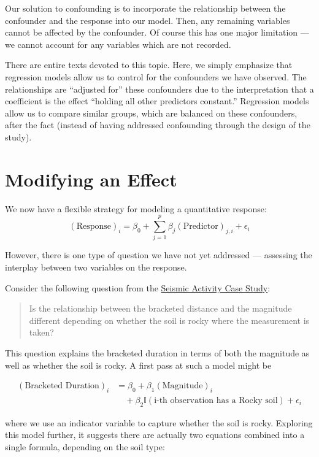 \documentclass[]{book}
\theoremstyle{plain}
\theoremstyle{mydefn}
\theoremstyle{myexmpl}
\theoremstyle{remark}
\begin{document}
Our solution to confounding is to incorporate the relationship between
the confounder and the response into our model. Then, any remaining
variables cannot be affected by the confounder. Of course this has one
major limitation --- we cannot account for any variables which are not
recorded.

There are entire texts devoted to this topic. Here, we simply emphasize
that regression models allow us to control for the confounders we have
observed. The relationships are ``adjusted for'' these confounders due
to the interpretation that a coefficient is the effect ``holding all
other predictors constant.'' Regression models allow us to compare
similar groups, which are balanced on these confounders, after the fact
(instead of having addressed confounding through the design of the
study).

\section{Modifying an Effect}\label{modifying-an-effect}

We now have a flexible strategy for modeling a quantitative response:
\[(\text{Response})_i = \beta_0 + \sum_{j=1}^{p} \beta_j (\text{Predictor})_{j,i} + \epsilon_i\]

However, there is one type of question we have not yet addressed ---
assessing the interplay between two variables on the response.

Consider the following question from the
\protect\hyperlink{CaseGreece}{Seismic Activity Case Study}:

\begin{quote}
Is the relationship between the bracketed distance and the magnitude
different depending on whether the soil is rocky where the measurement
is taken?
\end{quote}

This question explains the bracketed duration in terms of both the
magnitude as well as whether the soil is rocky. A first pass at such a
model might be

\[
\begin{aligned}
  (\text{Bracketed Duration})_i &= \beta_0 + \beta_1(\text{Magnitude})_i \\
    &\quad + \beta_2\mathbb{I}(\text{i-th observation has a Rocky soil}) + \epsilon_i
\end{aligned}
\]

where we use an indicator variable to capture whether the soil is rocky.
Exploring this model further, it suggests there are actually two
equations combined into a single formula, depending on the soil type:
\end{document}
